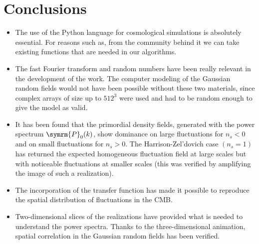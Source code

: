 \chapter*{Conclusions}
\begin{itemize}
    \item The use of the Python language for cosmological simulations is absolutely essential. For reasons such as, from the community behind it we can take existing functions that are needed in our algorithms.
    \item The fast Fourier transform and random numbers have been really relevant in the development of the work. The computer modeling of the Gaussian random fields would not have been possible without these two materials, since complex arrays of size up to \(512^3\) were used and had to be random enough to give the model as valid.
    \item It has been found that the primordial density fields, generated with the power spectrum \(\symrm{P}_0(k)\), show dominance on large fluctuations for \(n_s<0\) and on small fluctuations for \(n_s>0\). The Harrison-Zel'dovich case \((n_s=1)\) has returned the expected homogeneous fluctuation field at large scales but with noticeable fluctuations at smaller scales (this was verified by amplifying the image of such a realization).
    \item The incorporation of the transfer function has made it possible to reproduce the spatial distribution of fluctuations in the CMB.
    \item Two-dimensional slices of the realizations have provided what is needed to understand the power spectra. Thanks to the three-dimensional animation, spatial correlation in the Gaussian random fields has been verified.
\end{itemize}